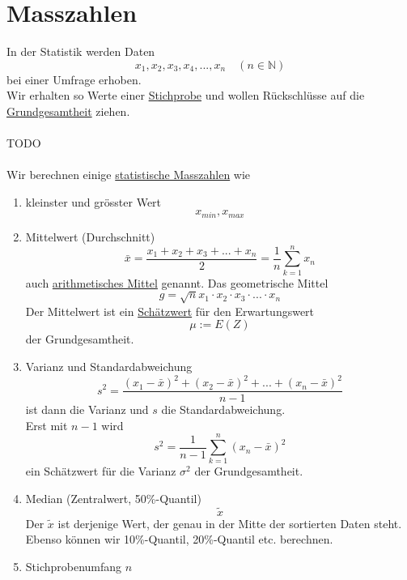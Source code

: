 \documentclass{report}
\begin{document}
\section{Masszahlen}
In der Statistik werden Daten
\begin{equation}
x_1, x_2, x_3, x_4, ..., x_n \quad (n \in \mathbb{N})
\end{equation}
bei einer Umfrage erhoben.\\
Wir erhalten so Werte einer \underline{Stichprobe} und wollen Rückschlüsse auf die \underline{Grundgesamtheit} ziehen.
\\\\TODO\\\\
Wir berechnen einige \underline{statistische Masszahlen} wie
\begin{enumerate}
\item
kleinster und grösster Wert
\begin{equation}
x_{min}, x_{max}
\end{equation}
\item
Mittelwert (Durchschnitt)
\begin{equation}
\bar{x} = \frac{x_1 + x_2 + x_3 + ... + x_n}{2} = \frac{1}{n} \sum_{k=1}^{n}{x_n}
\end{equation}
auch \underline{arithmetisches Mittel} genannt. Das geometrische Mittel
\begin{equation}
g = \sqrt{n}{x_1 \cdot x_2 \cdot x_3 \cdot ... \cdot x_n}
\end{equation}
Der Mittelwert ist ein \underline{Schätzwert} für den Erwartungswert
\begin{equation}
\mu := E(Z)
\end{equation}
der Grundgesamtheit.
\item
Varianz und Standardabweichung
\begin{equation}
s^2 = \frac{(x_1 - \bar{x})^2 + (x_2 - \bar{x})^2 + ... + (x_n - \bar{x})^2}{n-1}
\end{equation}
ist dann die Varianz und $s$ die Standardabweichung.\\
Erst mit $n-1$ wird
\begin{equation}
s^2 = \frac{1}{n-1} \sum_{k=1}^{n} (x_n - \bar{x})^2
\end{equation}
ein Schätzwert für die Varianz $\sigma^2$ der Grundgesamtheit.
\item
Median (Zentralwert, 50\%-Quantil)
\begin{equation}
\tilde{x}
\end{equation}
Der $\tilde{x}$ ist derjenige Wert, der genau in der Mitte der sortierten Daten steht.
Ebenso können wir 10\%-Quantil, 20\%-Quantil etc. berechnen.
\item
Stichprobenumfang $n$

\end{enumerate}
\end{document}

